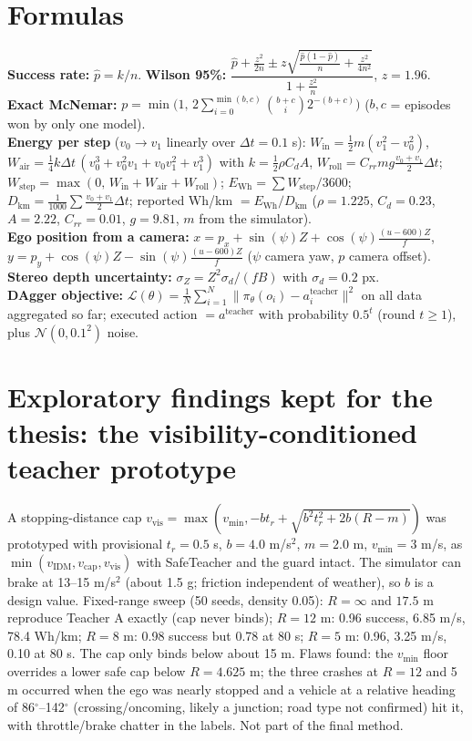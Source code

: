 \documentclass[11pt,a4paper]{article}
\begin{document}
\section{Formulas}
\textbf{Success rate:} $\hat p=k/n$. \textbf{Wilson 95\%:} $\dfrac{\hat p+\frac{z^2}{2n}\pm z\sqrt{\frac{\hat p(1-\hat p)}{n}+\frac{z^2}{4n^2}}}{1+\frac{z^2}{n}}$, $z=1.96$. \textbf{Exact McNemar:} $p=\min\!\Big(1,\,2\sum_{i=0}^{\min(b,c)}\binom{b+c}{i}2^{-(b+c)}\Big)$ ($b,c$ = episodes won by only one model).\\
\textbf{Energy per step} ($v_0\to v_1$ linearly over $\Delta t=0.1$ s): $W_{\text{in}}=\tfrac12 m(v_1^2-v_0^2)$, $W_{\text{air}}=\tfrac14 k\Delta t\,(v_0^3+v_0^2v_1+v_0v_1^2+v_1^3)$ with $k=\tfrac12\rho C_dA$, $W_{\text{roll}}=C_{rr}mg\tfrac{v_0+v_1}{2}\Delta t$; $W_{\text{step}}=\max(0,\,W_{\text{in}}+W_{\text{air}}+W_{\text{roll}})$; $E_{\text{Wh}}=\sum W_{\text{step}}/3600$; $D_{\text{km}}=\frac1{1000}\sum\frac{v_0+v_1}2\Delta t$; reported Wh/km $=E_{\text{Wh}}/D_{\text{km}}$ ($\rho=1.225$, $C_d=0.23$, $A=2.22$, $C_{rr}=0.01$, $g=9.81$, $m$ from the simulator).\\
\textbf{Ego position from a camera:} $x=p_x+\sin(\psi)Z+\cos(\psi)\frac{(u-600)Z}{f}$, $y=p_y+\cos(\psi)Z-\sin(\psi)\frac{(u-600)Z}{f}$ ($\psi$ camera yaw, $p$ camera offset).\\
\textbf{Stereo depth uncertainty:} $\sigma_Z=Z^2\sigma_d/(fB)$ with $\sigma_d=0.2$ px.\\
\textbf{DAgger objective:} $\mathcal L(\theta)=\frac1N\sum_{i=1}^N\|\pi_\theta(o_i)-a_i^{\text{teacher}}\|^2$ on all data aggregated so far; executed action $=a^{\text{teacher}}$ with probability $0.5^t$ (round $t\ge1$), plus $\mathcal N(0,0.1^2)$ noise.

\section{Exploratory findings kept for the thesis: the visibility-conditioned teacher prototype}
A stopping-distance cap $v_{\text{vis}}=\max(v_{\min},-bt_r+\sqrt{b^2t_r^2+2b(R-m)})$ was prototyped with provisional $t_r=0.5$ s, $b=4.0$ m/s$^2$, $m=2.0$ m, $v_{\min}=3$ m/s, as $\min(v_{\text{IDM}},v_{\text{cap}},v_{\text{vis}})$ with SafeTeacher and the guard intact. The simulator can brake at 13--15 m/s$^2$ (about 1.5 g; friction independent of weather), so $b$ is a design value. Fixed-range sweep (50 seeds, density 0.05): $R=\infty$ and $17.5$ m reproduce Teacher A exactly (cap never binds); $R=12$ m: 0.96 success, 6.85 m/s, 78.4 Wh/km; $R=8$ m: 0.98 success but 0.78 at 80 s; $R=5$ m: 0.96, 3.25 m/s, 0.10 at 80 s. The cap only binds below about 15 m. Flaws found: the $v_{\min}$ floor overrides a lower safe cap below $R=4.625$ m; the three crashes at $R=12$ and 5 m occurred when the ego was nearly stopped and a vehicle at a relative heading of 86$^\circ$--142$^\circ$ (crossing/oncoming, likely a junction; road type not confirmed) hit it, with throttle/brake chatter in the labels. Not part of the final method.
\end{document}
